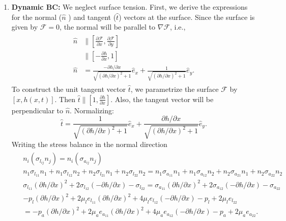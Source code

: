 \documentclass{article}
\begin{document}
\begin{enumerate}
\item \textbf{Dynamic BC:} We neglect surface tension. First, we derive the expressions for the normal ($\hat{n}$ ) and tangent ($\hat t$) vectors at the surface. Since the surface is given by $\mathcal{F} = 0$, the normal will be parallel to $\nabla \mathcal{F}$, i.e.,  
\begin{align}\label{eq:nHat}
 \begin{split}
  \hat{n} &\parallel \left[\frac{\partial \mathcal{F}}{\partial x}, \frac{\partial \mathcal{F}}{\partial y} \right]\\
  & \parallel \left[-\frac{\partial h}{\partial x}, 1 \right]\\
  \hat{n} &= \frac{-\partial h/\partial x}{\sqrt{\left( \partial h/\partial x\right)^{2} + 1} } \hat{e}_{x} + \frac{1}{\sqrt{\left( \partial h/\partial x\right)^{2} + 1} } \hat{e}_{y}.
 \end{split}
\end{align}
To construct the unit tangent vector $\hat{t}$, we parametrize the surface $\mathcal{F}$ by $[x, h(x, t)]$. Then $\hat{t}\parallel \left[1, \frac{\partial h}{\partial x} \right]$. Also, the tangent vector will be perpendicular to $\hat{n}$. Normalizing:
\begin{equation}\label{eq:tHat}
 \hat{t} = \frac{1}{\sqrt{\left( \partial h/\partial x\right)^{2} + 1} } \hat{e}_{x} + \frac{\partial h/\partial x}{\sqrt{\left( \partial h/\partial x\right)^{2} + 1} } \hat{e}_{y}.
\end{equation}
Writing the stress balance in the normal direction
\begin{align}\label{eq:dynamic_bc_n}
 \begin{split}
  & n_{i}(\sigma_{l_{ij}} n_{j}) = n_{i}(\sigma_{a_{ij}} n_{j})\\
  & n_{1} \sigma_{l_{11}} n_{1} + n_{1} \sigma_{l_{12}} n_{2} + n_{2} \sigma_{l_{21}} n_{1} + n_{2} \sigma_{l_{22}} n_{2} =  n_{1} \sigma_{a_{11}}n_{1} + n_{1} \sigma_{a_{12}} n_{2} + n_{2} \sigma_{a_{21}} n_{1} + n_{2} \sigma_{a_{22}} n_{2} \\
  & \sigma_{l_{11}}(\partial h/ \partial x)^{2} + 2 \sigma_{l_{12}}(-\partial h/ \partial x) - \sigma_{l_{22}} = \sigma_{a_{11}}(\partial h/ \partial x)^{2} + 2 \sigma_{a_{12}}(-\partial h/ \partial x) - \sigma_{a_{22}}\\
  & -p_{l}(\partial h/ \partial x)^{2} + 2 \mu_{l}e_{l_{11}}(\partial h/ \partial x)^{2} + 4 \mu_{l} e_{l_{12}} (-\partial h/ \partial x) - p_{l} + 2\mu_{l}e_{l_{22}} \\
  &= -p_{a}(\partial h/ \partial x)^{2} + 2 \mu_{a}e_{a_{11}}(\partial h/ \partial x)^{2} + 4 \mu_{a} e_{a_{12}}(-\partial h/ \partial x) - p_{a} + 2\mu_{a}e_{a_{22}}.
 \end{split}
\end{align}


\end{enumerate}
\end{document}

